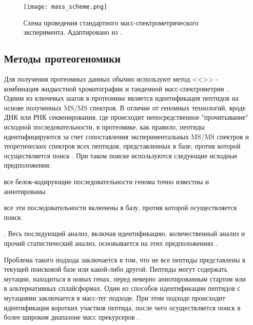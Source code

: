 \begin{figure}[ph!]
    \begin{center}
        \texttt{[image: mass\_scheme.png]}
    \end{center}
\caption[foo bar]{Схема проведения стандартного масс-спектрометрического эксперимента. Адаптировано из \cite{aebersold2003mass}.}
\label{mass_scheme}
\end{figure}


\subsection{Методы протеогеномики}
Для получения протеомных данных обычно используют метод <<>> - комбинация жидкостной хроматографии и тандемной масс-спектрометрии \cite{bantscheff2012quantitative}. Одним из ключевых шагов в протеомике является идентификация пептидов на основе полученных MS/MS спектров. В отличие от геномных технологий, вроде ДНК или РНК секвенирования, где происходит непосредственное "прочитывание" исходной последовательности, в протеомике, как правило, пептиды идентифицируются за счет сопоставления экспериментальных MS/MS спектров и теоретических спектров всех пептидов, представленных в базе, против которой осуществляется поиск \cite{nesvizhskii2010survey}.
При таком поиске используются следующие исходные предположения: 
\begin{inparaenum}
    \item все белок-кодирующие последовательности генома точно известны и аннотированы
    \item все эти последовательности включены в базу, против которой осуществляется поиск
\end{inparaenum}.
Весь последующий анализ, включая идентификацию, количественный анализ и прочий статистический анализ, основывается на этих предположениях \cite{nesvizhskii2005interpretation}.

Проблема такого подхода заключается в том, что не все пептиды представлены в текущей поисковой базе или какой-либо другой. Пептиды могут содержать мутации, находиться в новых генах, перед неверно аннотированным стартом или в альтернативных сплайсформах. 
Один из способов идентификации пептидов с мутациями заключается в масс-тег подходе. При этом подходе происходит идентификация коротких участков пептида, после чего осуществляется поиск в более широком диапазоне масс прекурсеров \cite{dasari2010tagrecon}. 

